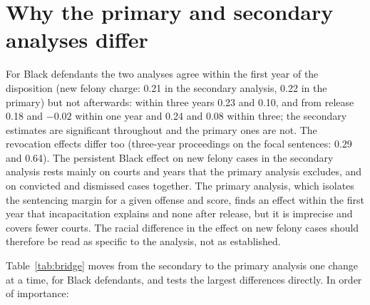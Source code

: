 \documentclass[11pt]{article}
\begin{document}
\section{Why the primary and secondary analyses differ}\label{sec:bridge}

For Black defendants the two analyses agree within the first year of the disposition (new felony charge: 0.21 in the secondary analysis, 0.22 in the primary) but not afterwards: within three years 0.23 and 0.10, and from release 0.18 and $-0.02$ within one year and 0.24 and 0.08 within three; the secondary estimates are significant throughout and the primary ones are not. The revocation effects differ too (three-year proceedings on the focal sentences: 0.29 and 0.64). The persistent Black effect on new felony cases in the secondary analysis rests mainly on courts and years that the primary analysis excludes, and on convicted and dismissed cases together. The primary analysis, which isolates the sentencing margin for a given offense and score, finds an effect within the first year that incapacitation explains and none after release, but it is imprecise and covers fewer courts. The racial difference in the effect on new felony cases should therefore be read as specific to the analysis, not as established.

Table~\ref{tab:bridge} moves from the secondary to the primary analysis one change at a time, for Black defendants, and tests the largest differences directly. In order of importance:
\end{document}
